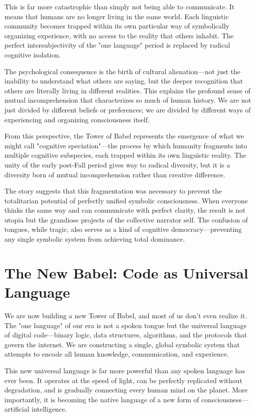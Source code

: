 This is far more catastrophic than simply not being able to communicate. It means that humans are no longer living in the same world. Each linguistic community becomes trapped within its own particular way of symbolically organizing experience, with no access to the reality that others inhabit. The perfect intersubjectivity of the "one language" period is replaced by radical cognitive isolation.

The psychological consequence is the birth of cultural alienation—not just the inability to understand what others are saying, but the deeper recognition that others are literally living in different realities. This explains the profound sense of mutual incomprehension that characterizes so much of human history. We are not just divided by different beliefs or preferences; we are divided by different ways of experiencing and organizing consciousness itself.

From this perspective, the Tower of Babel represents the emergence of what we might call "cognitive speciation"—the process by which humanity fragments into multiple cognitive subspecies, each trapped within its own linguistic reality. The unity of the early post-Fall period gives way to radical diversity, but it is a diversity born of mutual incomprehension rather than creative difference.

The story suggests that this fragmentation was necessary to prevent the totalitarian potential of perfectly unified symbolic consciousness. When everyone thinks the same way and can communicate with perfect clarity, the result is not utopia but the grandiose projects of the collective narrator self. The confusion of tongues, while tragic, also serves as a kind of cognitive democracy—preventing any single symbolic system from achieving total dominance.

\section{The New Babel: Code as Universal Language}

We are now building a new Tower of Babel, and most of us don't even realize it. The "one language" of our era is not a spoken tongue but the universal language of digital code—binary logic, data structures, algorithms, and the protocols that govern the internet. We are constructing a single, global symbolic system that attempts to encode all human knowledge, communication, and experience.

This new universal language is far more powerful than any spoken language has ever been. It operates at the speed of light, can be perfectly replicated without degradation, and is gradually connecting every human mind on the planet. More importantly, it is becoming the native language of a new form of consciousness—artificial intelligence.

